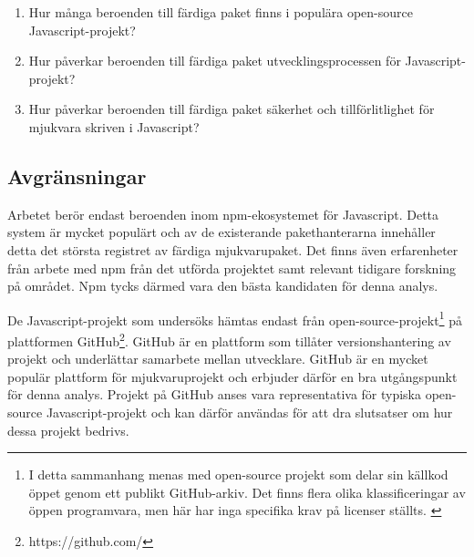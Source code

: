 \begin{enumerate}
  \item\label{joel_o-fs:1} Hur många beroenden till färdiga paket finns i populära open-source Javascript-projekt?

  \item\label{joel_o-fs:2} Hur påverkar beroenden till färdiga paket utvecklingsprocessen för Javascript-projekt?

  \item\label{joel_o-fs:3} Hur påverkar beroenden till färdiga paket säkerhet och tillförlitlighet för mjukvara skriven i Javascript?
\end{enumerate}

\subsection{Avgränsningar}
\label{subsec:joel_o-delimitations}
Arbetet berör endast beroenden inom npm-ekosystemet för Javascript. Detta system är mycket populärt och av de existerande pakethanterarna innehåller detta det största registret av färdiga mjukvarupaket.\cite{Decan2018} Det finns även erfarenheter från arbete med npm från det utförda projektet samt relevant tidigare forskning på området. Npm tycks därmed vara den bästa kandidaten för denna analys.

De Javascript-projekt som undersöks hämtas endast från open-source-projekt\footnote{I detta sammanhang menas med open-source projekt som delar sin källkod öppet genom ett publikt GitHub-arkiv. Det finns flera olika klassificeringar av öppen programvara, men här har inga specifika krav på licenser ställts. \cite{what-is-open-source}} på plattformen GitHub\footnote{https://github.com/}. GitHub är en plattform som tillåter versionshantering av projekt och underlättar samarbete mellan utvecklare. GitHub är en mycket populär plattform för mjukvaruprojekt och erbjuder därför en bra utgångspunkt för denna analys. Projekt på GitHub anses vara representativa för typiska open-source Javascript-projekt och kan därför användas för att dra slutsatser om hur dessa projekt bedrivs.
